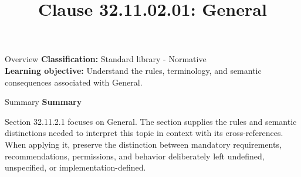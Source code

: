 \documentclass[10pt,letterpaper]{article}
\title{Clause 32.11.02.01: General}
\author{}
\date{}
\begin{document}
\maketitle
\begin{CornellOverviewBox}{Overview}
\textbf{Classification:} Standard library - Normative\\[2pt]
\textbf{Learning objective:} Understand the rules, terminology, and semantic consequences associated with General.
\end{CornellOverviewBox}\begin{CornellSummaryBox}{Summary}
{\sffamily\bfseries\color{Accent} Summary}\par\vspace{3pt}Section 32.11.2.1 focuses on General. The section supplies the rules and semantic distinctions needed to interpret this topic in context with its cross-references. When applying it, preserve the distinction between mandatory requirements, recommendations, permissions, and behavior deliberately left undefined, unspecified, or implementation-defined.
\end{CornellSummaryBox}
\end{document}
